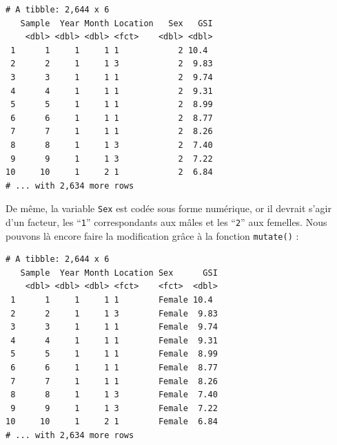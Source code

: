 \documentclass[
  a4paper,
]{article}
\newenvironment{Shaded}{\begin{snugshade}}{\end{snugshade}}
\newcommand{\DataTypeTok}[1]{\textcolor[rgb]{0.00,0.34,0.68}{#1}}
\newcommand{\DecValTok}[1]{\textcolor[rgb]{0.69,0.50,0.00}{#1}}
\newcommand{\KeywordTok}[1]{\textcolor[rgb]{0.12,0.11,0.11}{\textbf{#1}}}
\newcommand{\NormalTok}[1]{\textcolor[rgb]{0.12,0.11,0.11}{#1}}
\newcommand{\OperatorTok}[1]{\textcolor[rgb]{0.12,0.11,0.11}{#1}}
\newcommand{\StringTok}[1]{\textcolor[rgb]{0.75,0.01,0.01}{#1}}
\begin{document}
\begin{Shaded}
\end{Shaded}

\begin{verbatim}
# A tibble: 2,644 x 6
   Sample  Year Month Location   Sex   GSI
    <dbl> <dbl> <dbl> <fct>    <dbl> <dbl>
 1      1     1     1 1            2 10.4 
 2      2     1     1 3            2  9.83
 3      3     1     1 1            2  9.74
 4      4     1     1 1            2  9.31
 5      5     1     1 1            2  8.99
 6      6     1     1 1            2  8.77
 7      7     1     1 1            2  8.26
 8      8     1     1 3            2  7.40
 9      9     1     1 3            2  7.22
10     10     1     2 1            2  6.84
# ... with 2,634 more rows
\end{verbatim}

De même, la variable \texttt{Sex} est codée sous forme numérique, or il devrait s'agir d'un facteur, les ``\texttt{1}'' correspondants aux mâles et les ``\texttt{2}'' aux femelles. Nous pouvons là encore faire la modification grâce à la fonction \texttt{mutate()} :

\begin{Shaded}
\end{Shaded}

\begin{verbatim}
# A tibble: 2,644 x 6
   Sample  Year Month Location Sex      GSI
    <dbl> <dbl> <dbl> <fct>    <fct>  <dbl>
 1      1     1     1 1        Female 10.4 
 2      2     1     1 3        Female  9.83
 3      3     1     1 1        Female  9.74
 4      4     1     1 1        Female  9.31
 5      5     1     1 1        Female  8.99
 6      6     1     1 1        Female  8.77
 7      7     1     1 1        Female  8.26
 8      8     1     1 3        Female  7.40
 9      9     1     1 3        Female  7.22
10     10     1     2 1        Female  6.84
# ... with 2,634 more rows
\end{verbatim}
\end{document}
